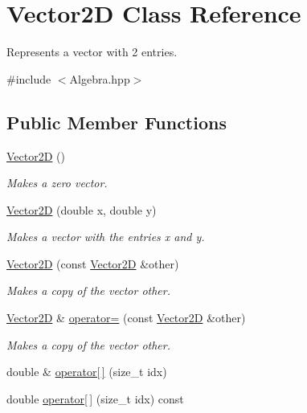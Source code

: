 \hypertarget{class_vector2_d}{\section{Vector2\-D Class Reference}
\label{class_vector2_d}
}


Represents a vector with 2 entries.  




{\ttfamily \#include $<$Algebra.\-hpp$>$}

\subsection*{Public Member Functions}
\begin{DoxyCompactItemize}
\item 
\hyperlink{class_vector2_d_a98e9997ebb7a629f4db52397d4e0d653}{Vector2\-D} ()
\begin{DoxyCompactList}\small\item\em Makes a zero vector. \end{DoxyCompactList}\item 
\hyperlink{class_vector2_d_a525e125aac4c844f04c52ddb0e75d594}{Vector2\-D} (double x, double y)
\begin{DoxyCompactList}\small\item\em Makes a vector with the entries x and y. \end{DoxyCompactList}\item 
\hyperlink{class_vector2_d_a1d9d4e0b040eab0369eec29401b31046}{Vector2\-D} (const \hyperlink{class_vector2_d}{Vector2\-D} \&other)
\begin{DoxyCompactList}\small\item\em Makes a copy of the vector {\itshape other}. \end{DoxyCompactList}\item 
\hyperlink{class_vector2_d}{Vector2\-D} \& \hyperlink{class_vector2_d_a4fd6b530394125b8ece087531140a1fc}{operator=} (const \hyperlink{class_vector2_d}{Vector2\-D} \&other)
\begin{DoxyCompactList}\small\item\em Makes a copy of the vector {\itshape other}. \end{DoxyCompactList}\item 
double \& \hyperlink{class_vector2_d_afc8c3b48321e523c08c0ce18dd19574c}{operator\mbox{[}$\,$\mbox{]}} (size\-\_\-t idx)
\item 
double \hyperlink{class_vector2_d_ab60ef575eb35a7b4b62629a8cf58a2d7}{operator\mbox{[}$\,$\mbox{]}} (size\-\_\-t idx) const 

\end{DoxyCompactItemize}
